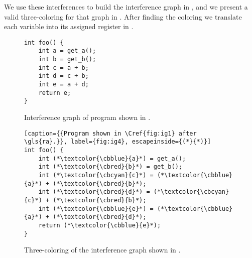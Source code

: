We use these interferences to build the interference graph in , and we present a valid three-coloring for that graph in . After finding the coloring we translate each variable into its assigned register in .

\begin{figure}[ht]
\centering
\begin{minipage}{0.48\textwidth}
\lstset{style=C}
\begin{lstlisting}[caption={C program returning $2a + 3b$.}, label={fig:ig1}]
int foo() {
    int a = get_a();
    int b = get_b();
    int c = a + b;
    int d = c + b;
    int e = a + d;
    return e;
}
\end{lstlisting}
\end{minipage}
\hfill
\begin{minipage}{0.48\textwidth}
  \centering
  \caption{Interference graph of program shown in .}
  \label{fig:ig2}
\end{minipage}
\end{figure}

\begin{figure}[ht]
\centering
\begin{minipage}{0.48\textwidth}
  \centering
  \caption{Three-coloring of the interference graph shown in .}
  \label{fig:ig3}
\end{minipage}
\hfill
\begin{minipage}{0.48\textwidth}
\lstset{style=C}
\begin{lstlisting}[caption={{Program shown in \Cref{fig:ig1} after \gls{ra}.}}, label={fig:ig4}, escapeinside={(*}{*)}]
int foo() {
    int (*\textcolor{\cbblue}{a}*) = get_a();
    int (*\textcolor{\cbred}{b}*) = get_b();
    int (*\textcolor{\cbcyan}{c}*) = (*\textcolor{\cbblue}{a}*) + (*\textcolor{\cbred}{b}*);
    int (*\textcolor{\cbred}{d}*) = (*\textcolor{\cbcyan}{c}*) + (*\textcolor{\cbred}{b}*);
    int (*\textcolor{\cbblue}{e}*) = (*\textcolor{\cbblue}{a}*) + (*\textcolor{\cbred}{d}*);
    return (*\textcolor{\cbblue}{e}*);
}
\end{lstlisting}
\end{minipage}
\end{figure}

